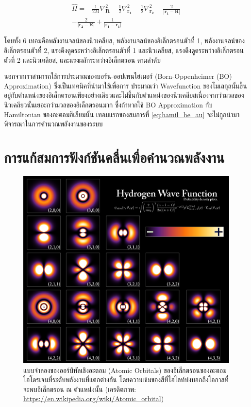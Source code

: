 \begin{multline}\label{eq:hamil_he_au}
    \hat{H} = -\frac{1}{2M} \nabla^{2}_{\bm{R}} 
              -\frac{1}{2} \nabla^{2}_{\bm{r_{1}}}
              -\frac{1}{2} \nabla^{2}_{\bm{r_{2}}}
              -\frac{2}{|\bm{r_{1}}-\bm{R}|}
              \\
              -\frac{2}{|\bm{r_{2}}-\bm{R}|}
              +\frac{1}{|\bm{r_{1}}-\bm{r_{1}}|}
\end{multline}

\noindent โดยทั้ง 6 เทอมคือพลังงานจลน์ของนิวเคลียส, พลังงานจลน์ของอิเล็กตรอนตัวที่ 1, พลังงานจลน์ของอิเล็กตรอนตัวที่ 2, 
แรงดึงดูดระหว่างอิเล็กตรอนตัวที่ 1 และนิวเคลียส, แรงดึงดูดระหว่างอิเล็กตรอนตัวที่ 2 และนิวเคลียส, และแรงผลักระหว่างอิเล็กตรอน ตามลำดับ 

นอกจากเราสามารถใช้การประมาณของบอร์น-ออปเพนไฮเมอร์ (Born-Oppenheimer (BO) Approximation) ซึ่งเป็นเทคนิคที่นำมาใช้เพื่อการ%
ประมาณว่า Wavefunction ของโมเลกุลนั้นขึ้นอยู่กับตำแหน่งของอิเล็กตรอนเพียงอย่างเดียวและไม่ขึ้นกับตำแหน่งของนิวเคลียสเนื่องจากว่ามวลของ%
นิวเคลียวนั้นเยอะกว่ามวลของอิเล็กตรอนมาก ซึ่งถ้าหากใช้ BO Approximation กับ Hamiltonian ของอะตอมฮีเลียมนั้น เทอมแรกของสมการที่ 
\ref{eq:hamil_he_au} จะไม่ถูกนำมาพิจารณาในการคำนวณพลังงานของระบบ

\section{การแก้สมการฟังก์ชันคลื่นเพื่อคำนวณพลังงาน}
\label{sec:wavefunc_ener}

\begin{figure}[htbp]
    \centering
    \includegraphics[width=0.9\linewidth]{fig/hydrogen_density_plots.png}
    \caption{แบบจำลองของออร์บิทัลเชิงอะตอม (Atomic Orbitals) ของอิเล็กตรอนของอะตอมไฮโดรเจนที่ระดับพลังงานที่แตกต่างกัน
    โดยความเข้มของสีที่ไฮไลท์บ่งบอกถึงโอกาสที่จะพบอิเล็กตรอน ณ ตำแหน่งนั้น 
    (เครดิตภาพ: \url{https://en.wikipedia.org/wiki/Atomic_orbital})}
    \label{fig:hydrogen_density}
\end{figure}

